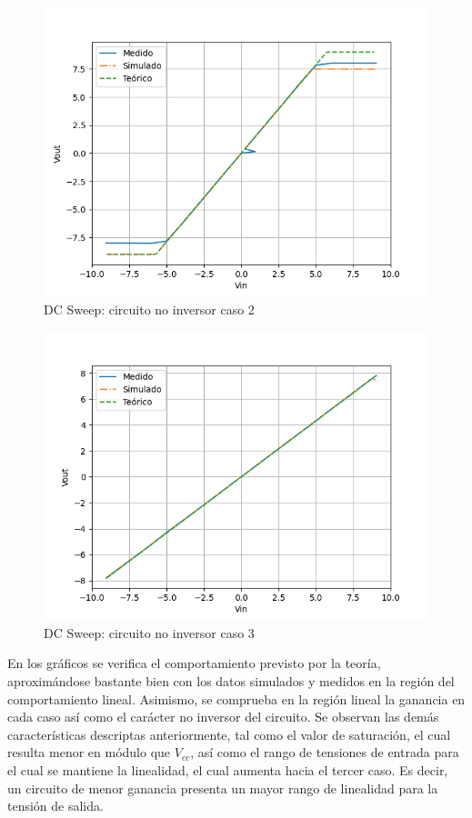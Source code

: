 \begin{figure}[H]
	\centering
	\includegraphics[scale=0.5]{./Imagenes/NoInvCaso2DC.png}
	\caption{DC Sweep: circuito no inversor caso 2}
	\label{fig:circinvcaso1}
\end{figure}

\begin{figure}[H]
	\centering
	\includegraphics[scale=0.5]{./Imagenes/NoInvCaso3DC.png}
	\caption{DC Sweep: circuito no inversor caso 3}
	\label{fig:circinvcaso1}
\end{figure}

En los gráficos se verifica el comportamiento previsto por la teoría, aproximándose bastante bien con los datos simulados y medidos en la región del comportamiento lineal. Asimismo, se comprueba en la región lineal la ganancia en cada caso así como el carácter no inversor del circuito. Se observan las demás características descriptas anteriormente, tal como el valor de saturación, el cual resulta menor en módulo que $V_{cc}$, así como el rango de tensiones de entrada para el cual se mantiene la linealidad, el cual aumenta hacia el tercer caso. Es decir, un circuito de menor ganancia presenta un mayor rango de linealidad para la tensión de salida. 

